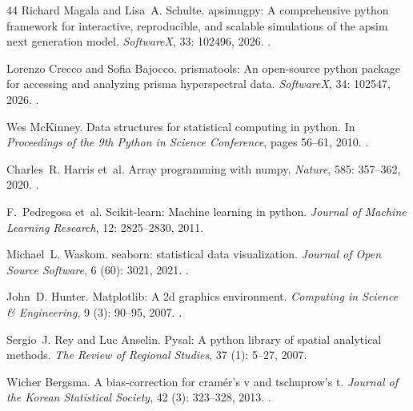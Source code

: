 \documentclass[11pt, letterpaper]{article}
\begin{document}
\begin{thebibliography}{44}
Richard Magala and Lisa~A. Schulte.
\newblock apsimngpy: A comprehensive python framework for interactive, reproducible, and scalable simulations of the apsim next generation model.
\newblock \emph{SoftwareX}, 33: 102496, 2026.
\newblock {}.

Lorenzo Crecco and Sofia Bajocco.
\newblock prismatools: An open-source python package for accessing and analyzing prisma hyperspectral data.
\newblock \emph{SoftwareX}, 34: 102547, 2026.
\newblock {}.

Wes McKinney.
\newblock Data structures for statistical computing in python.
\newblock In \emph{Proceedings of the 9th Python in Science Conference}, pages 56--61, 2010.
\newblock {}.

Charles~R. Harris et~al.
\newblock Array programming with numpy.
\newblock \emph{Nature}, 585: 357--362, 2020.
\newblock {}.

F.~Pedregosa et~al.
\newblock Scikit-learn: Machine learning in python.
\newblock \emph{Journal of Machine Learning Research}, 12: 2825--2830, 2011.

Michael~L. Waskom.
\newblock seaborn: statistical data visualization.
\newblock \emph{Journal of Open Source Software}, 6 (60): 3021, 2021.
\newblock {}.

John~D. Hunter.
\newblock Matplotlib: A 2d graphics environment.
\newblock \emph{Computing in Science \& Engineering}, 9 (3): 90--95, 2007.
\newblock {}.

Sergio~J. Rey and Luc Anselin.
\newblock Pysal: A python library of spatial analytical methods.
\newblock \emph{The Review of Regional Studies}, 37 (1): 5--27, 2007.

Wicher Bergsma.
\newblock A bias-correction for cram{\'e}r's v and tschuprow's t.
\newblock \emph{Journal of the Korean Statistical Society}, 42 (3): 323--328, 2013.
\newblock {}.


\end{thebibliography}
\end{document}
